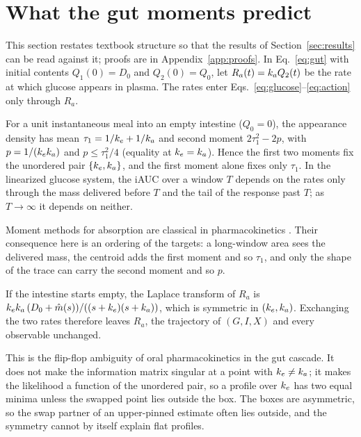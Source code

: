 \section{What the gut moments predict}
\label{sec:theory}

This section restates textbook structure so that the results of Section~\ref{sec:results} can be read against it; proofs are in Appendix~\ref{app:proofs}.
In Eq.~\eqref{eq:gut} with initial contents $Q_1(0)=D_0$ and $Q_2(0)=Q_0$, let $R_a(t)=k_a Q_2(t)$ be the rate at which glucose appears in plasma.
The rates enter Eqs.~\eqref{eq:glucose}--\eqref{eq:action} only through $R_a$.

\begin{proposition}
\label{prop:moments}
For a unit instantaneous meal into an empty intestine ($Q_0=0$), the appearance density has mean $\tau_1=1/k_e+1/k_a$ and second moment $2\tau_1^2-2p$, with $p=1/(k_ek_a)$ and $p\le\tau_1^2/4$ (equality at $k_e=k_a$).
Hence the first two moments fix the unordered pair $\{k_e,k_a\}$, and the first moment alone fixes only $\tau_1$.
In the linearized glucose system, the iAUC over a window $T$ depends on the rates only through the mass delivered before $T$ and the tail of the response past $T$; as $T\to\infty$ it depends on neither.
\end{proposition}

Moment methods for absorption are classical in pharmacokinetics \citep{cutler1978theory,yamaoka1978statistical,riegelman1980application}.
Their consequence here is an ordering of the targets: a long-window area sees the delivered mass, the centroid adds the first moment and so $\tau_1$, and only the shape of the trace can carry the second moment and so $p$.

\begin{proposition}
\label{prop:exchange}
If the intestine starts empty, the Laplace transform of $R_a$ is $k_ek_a\,(D_0+\hat m(s))/((s+k_e)(s+k_a))$, which is symmetric in $(k_e,k_a)$.
Exchanging the two rates therefore leaves $R_a$, the trajectory of $(G,I,X)$ and every observable unchanged.
\end{proposition}

This is the flip-flop ambiguity of oral pharmacokinetics \citep{boxenbaum1998flipflop,yanez2011flipflop} in the gut cascade.
It does not make the information matrix singular at a point with $k_e\ne k_a$; it makes the likelihood a function of the unordered pair, so a profile over $k_e$ has two equal minima unless the swapped point lies outside the box.
The boxes are asymmetric, so the swap partner of an upper-pinned estimate often lies outside, and the symmetry cannot by itself explain flat profiles.

